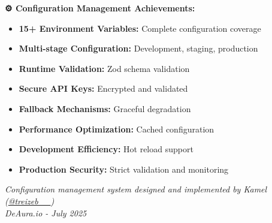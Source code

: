 \documentclass[11pt,a4paper]{article}
\begin{document}
\begin{tcolorbox}[colback=successGreen!10,colframe=successGreen]
\textbf{⚙️ Configuration Management Achievements:}
\begin{itemize}
    \item \textbf{15+ Environment Variables:} Complete configuration coverage
    \item \textbf{Multi-stage Configuration:} Development, staging, production
    \item \textbf{Runtime Validation:} Zod schema validation
    \item \textbf{Secure API Keys:} Encrypted and validated
    \item \textbf{Fallback Mechanisms:} Graceful degradation
    \item \textbf{Performance Optimization:} Cached configuration
    \item \textbf{Development Efficiency:} Hot reload support
    \item \textbf{Production Security:} Strict validation and monitoring
\end{itemize}
\end{tcolorbox}

\vspace{1cm}

\begin{center}
\textit{Configuration management system designed and implemented by Kamel (\href{https://x.com/treizeb__}{@treizeb\_\_})\\
DeAura.io - July 2025}
\end{center}
\end{document}
